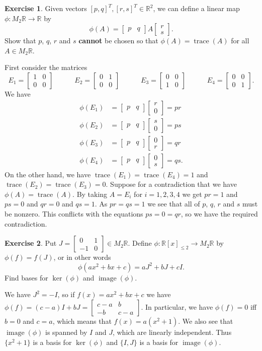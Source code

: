 \documentclass{amsart}
\newcommand{\R}         {{\mathbb{R}}}
\newcommand{\trc}       {\operatorname{trace}}
\newcommand{\img}       {\operatorname{image}}
\newcommand{\bbm}       {\left[\begin{matrix}}
\newcommand{\ebm}       {\end{matrix}\right]}
\newcommand{\xra}       {\xrightarrow}
\renewcommand{\:}       {\colon}
\theoremstyle{definition}
\newtheorem{exercise}{Exercise}[section]
\renewenvironment{solution}{\SolutionAtEnd}{\endSolutionAtEnd}
\begin{document}
\begin{exercise}
 Given vectors $[p,q]^T,[r,s]^T\in\R^2$, we can define a linear
 map $\phi\:M_2\R\xra{}\R$ by 
 \[ \phi(A) = \bbm p & q \ebm A \bbm r \\ s\ebm. \]
 Show that $p$, $q$, $r$ and $s$ \textbf{cannot} be chosen
 so that $\phi(A)=\trc(A)$ for all $A\in M_2\R$.  
\end{exercise}
\begin{solution}
 First consider the matrices 
 \[ E_1 = \bbm 1&0\\0&0 \ebm \hspace{3em}
    E_2 = \bbm 0&1\\0&0 \ebm \hspace{3em}
    E_3 = \bbm 0&0\\1&0 \ebm \hspace{3em}
    E_4 = \bbm 0&0\\0&1 \ebm.
 \]
 We have
 \begin{align*}
  \phi(E_1) &= \bbm p&q\ebm\bbm r \\ 0\ebm = pr \\
  \phi(E_2) &= \bbm p&q\ebm\bbm s \\ 0\ebm = ps \\
  \phi(E_3) &= \bbm p&q\ebm\bbm 0 \\ r\ebm = qr \\
  \phi(E_4) &= \bbm p&q\ebm\bbm 0 \\ s\ebm = qs.
 \end{align*}
 On the other hand, we have $\trc(E_1)=\trc(E_4)=1$ and
 $\trc(E_2)=\trc(E_3)=0$.  Suppose for a contradiction
 that we have $\phi(A)=\trc(A)$.  By taking $A=E_i$ for
 $i=1,2,3,4$ we get $pr=1$ and $ps=0$ and $qr=0$ and
 $qs=1$.  As $pr=qs=1$ we see that all of $p$, $q$, $r$ and
 $s$ must be nonzero.  This conflicts with the equations
 $ps=0=qr$, so we have the required contradiction.
\end{solution}

\begin{exercise}
 Put $J=\bbm 0&1\\-1&0\ebm\in M_2\R$.  Define
 $\phi\:\R[x]_{\leq 2}\to M_2\R$ by $\phi(f)=f(J)$, or in other
 words
 \[ \phi(ax^2 + bx + c) = aJ^2 + bJ + cI. \]
 Find bases for $\ker(\phi)$ and $\img(\phi)$.
\end{exercise}
\begin{solution}
 We have $J^2=-I$, so if $f(x)=ax^2+bx+c$ we have
 $\phi(f)=(c-a)I+bJ=\bbm c-a&b\\-b&c-a\ebm$.  In particular,
 we have $\phi(f)=0$ iff $b=0$ and $c=a$, which means that
 $f(x)=a(x^2+1)$.  We also see that $\img(\phi)$ is spanned
 by $I$ and $J$, which are linearly independent.  Thus
 $\{x^2+1\}$ is a basis for $\ker(\phi)$ and $\{I,J\}$ is a
 basis for $\img(\phi)$.
\end{solution}
\end{document}
